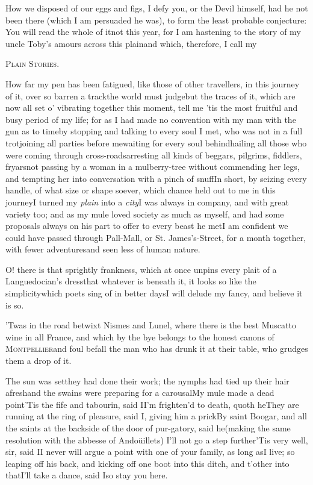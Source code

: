 \documentclass{article}
\begin{document}
\tsh How we disposed of our eggs and figs, I defy you,
or the Devil himself, had he not been there (which I am persuaded
he was), to form the least probable conjecture: You will read the
whole of it\break\tsh not this year, for I am hastening to the
story of my uncle Toby’s amours\break
{}
\pb across this plain\tsk and which, therefore, I call
my

\centerline{\textsc{Plain Stories}.}

\smallskip

How far my pen has been fatigued, like those of other
travellers, in this journey of it, over so barren a track\tsk the
world must judge\tsk but the traces of it, which are now all set
o’ vibrating together this moment, tell me ’tis the
most fruitful and busy period of my life; for as I had made no
convention with my man with the gun as to time\tsk by stopping
and talking to every soul I met, who was not in a full
trot\tsk joining all parties before me\tsk waiting for every
soul behind\tsk hailing all those who were coming through
cross-roads\tsk arresting all kinds of beggars, pilgrims,
fiddlers, fryars\tsk not passing by a woman in a
mulberry-tree\pb
without commending her legs, and tempting her into conversation
with a pinch of snuff\tsh In short, by seizing every
handle, of what size or shape soever, which chance held out to me
in this journey\tsk I turned my \textit{plain} into a
\textit{city}\tsk I was always in company, and with great variety too; and
as my mule loved society as much as myself, and had some proposals
always on his part to offer to every beast he met\tsk I am
confident we could have passed through Pall-Mall, or St.\@
James’s-Street, for a month together, with fewer
adventures\tsk and seen less of human nature.

O! there is that sprightly frankness, which at once unpins every
plait of a Languedocian’s dress\tsk that whatever is
beneath it, it looks so like the simplicity\pb which poets sing of in
better days\tsk I will delude my fancy, and believe it is so.

’Twas in the road betwixt Nismes and Lunel,
where there is the best Muscatto wine in all France,
and which by the bye belongs to the honest canons of
\textsc{Montpellier}\tsk and foul befall the man who has
drunk it at their table, who grudges them a drop of it.

\tsh The sun was set\tsk they had done their work;
the nymphs had tied up their hair afresh\tsk and the swains were
preparing for a carousal\tsk My mule made a dead point\tsh ’Tis the fife
and tabourin, said I\tsh I’m frighten’d to
death, quoth he\tsh They are running at the ring of
pleasure, said I, giving him a prick\tsh By saint
Boogar, and all the saints at the backside of the door of
pur-\pb gatory, said he\tsk (making the same resolution with the
abbesse of Andoüillets) I’ll not go a step
further\tsh ’Tis very well, sir, said
I\tsh I never will argue a point with one of your family,
as long as\break I live; so leaping off his back, and kicking off one
boot into this ditch, and t’other into that\tsk I’ll
take a dance, said I\tsk so stay you here.
\end{document}

